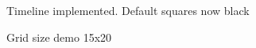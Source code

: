 \documentclass[11pt]{article} %
\begin{document}
  \begin{figure}[H]
  	\centering
  	\caption{Timeline implemented. Default squares now black}
  	\label{fig:GUI Design 5}
  \end{figure}  
  
  \begin{figure}[H]
  	\centering
  	\caption{Grid size demo 15x20}
  	\label{fig:GUI Design 5 size demo 1}
  \end{figure} 
  
\end{document}
